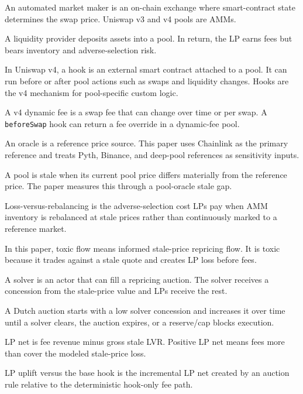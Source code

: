 \documentclass[11pt]{article}
\begin{document}
\begin{description}[leftmargin=0.35in, style=nextline]
\item[AMM.]
An automated market maker is an on-chain exchange where smart-contract state determines the swap price. Uniswap v3 and v4 pools are AMMs.

\item[LP.]
A liquidity provider deposits assets into a pool. In return, the LP earns fees but bears inventory and adverse-selection risk.

\item[Hook.]
In Uniswap v4, a hook is an external smart contract attached to a pool. It can run before or after pool actions such as swaps and liquidity changes. Hooks are the v4 mechanism for pool-specific custom logic.

\item[Dynamic fee.]
A v4 dynamic fee is a swap fee that can change over time or per swap. A \texttt{beforeSwap} hook can return a fee override in a dynamic-fee pool.

\item[Oracle.]
An oracle is a reference price source. This paper uses Chainlink as the primary reference and treats Pyth, Binance, and deep-pool references as sensitivity inputs.

\item[Stale price.]
A pool is stale when its current pool price differs materially from the reference price. The paper measures this through a pool-oracle stale gap.

\item[LVR.]
Loss-versus-rebalancing is the adverse-selection cost LPs pay when AMM inventory is rebalanced at stale prices rather than continuously marked to a reference market.

\item[Toxic flow.]
In this paper, toxic flow means informed stale-price repricing flow. It is toxic because it trades against a stale quote and creates LP loss before fees.

\item[Solver.]
A solver is an actor that can fill a repricing auction. The solver receives a concession from the stale-price value and LPs receive the rest.

\item[Dutch auction.]
A Dutch auction starts with a low solver concession and increases it over time until a solver clears, the auction expires, or a reserve/cap blocks execution.

\item[LP net.]
LP net is fee revenue minus gross stale LVR. Positive LP net means fees more than cover the modeled stale-price loss.

\item[LP uplift vs base hook.]
LP uplift versus the base hook is the incremental LP net created by an auction rule relative to the deterministic hook-only fee path.
\end{description}
\end{document}
